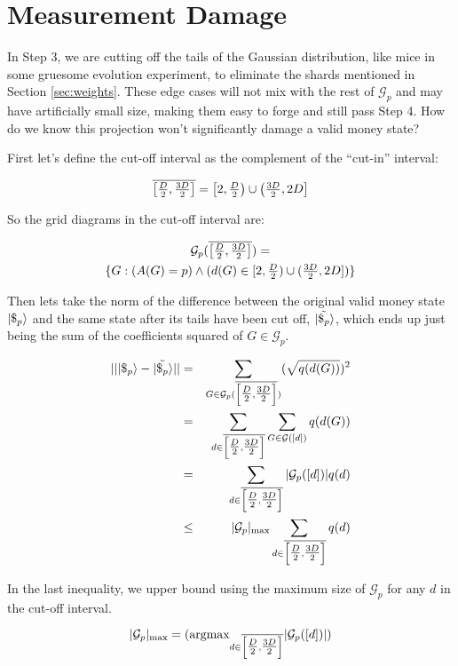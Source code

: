 \section{Measurement Damage}
\label{sec:damage}

In Step 3, we are cutting off the tails of the Gaussian distribution,
like mice in some gruesome evolution experiment,
to eliminate the shards mentioned in Section \ref{sec:weights}.
 These edge cases will not mix with the rest of
$\mathcal{G}_p$ and may have artificially small size, making them easy
to forge and still pass Step 4.
How do we know this projection won't significantly damage a
valid money state?

First let's define the cut-off interval as the complement of the
``cut-in'' interval:

\begin{displaymath}
\overline{\left[\tfrac{D}{2}, \tfrac{3D}{2}\right]} = \left[2, \tfrac{D}{2} \right)
\cup \left(\tfrac{3D}{2},2D\right]
\end{displaymath}

So the grid diagrams in the cut-off interval are:

\begin{multline*}
\mathcal{G}_p(\overline{\left[\tfrac{D}{2}, \tfrac{3D}{2}\right]})
= \\ \{
G: (A(G)=p) \land (d(G) \in
[2, \tfrac{D}{2})
\cup (\tfrac{3D}{2},2D])
\}
\end{multline*}

Then lets take the norm of the difference between the original valid money state
$|\$_p \rangle$ and the same state after its tails have been cut off,
$|\tilde{\$_p} \rangle$, which ends up just being the sum of the coefficients
squared
of $G \in \mathcal{G}_p$.

\begin{eqnarray*}
|| |\$_p \rangle - |\tilde{\$_p} \rangle || & = &
\sum_{G \in \mathcal{G}_p(\overline{\left[\tfrac{D}{2}, \tfrac{3D}{2}\right]})} (\sqrt{q(d(G))})^2 \\
& = & \sum_{d \in \overline{\left[\tfrac{D}{2}, \tfrac{3D}{2}\right]}} \sum_{G \in \mathcal{G}([d])} q(d(G)) \\
& = & \sum_{d \in \overline{\left[\tfrac{D}{2}, \tfrac{3D}{2}\right]}} |\mathcal{G}_p([d])| q(d) \\
& \le & |\mathcal{G}_p|_{\textrm{max}}
\sum_{d \in \overline{\left[\tfrac{D}{2}, \tfrac{3D}{2}\right]}} q(d)
\end{eqnarray*}

In the last inequality, we upper bound using the maximum size of
$\mathcal{G}_p$ for any $d$ in the cut-off interval.

\begin{displaymath}
|\mathcal{G}_p|_{\textrm{max}} =
(\textrm{argmax}_{d \in \overline{\left[\tfrac{D}{2}, \tfrac{3D}{2}\right]}}|\mathcal{G}_p([d])|)
\end{displaymath}

